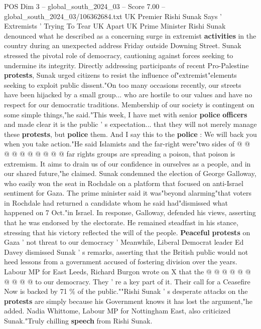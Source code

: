 \begin{textsample}{POS Dim 3 – global\_south\_2024\_03 – Score 7.00 – global\_south\_2024\_03/106362684.txt}  \label{ex:f3_pos_413}
UK Premier Rishi Sunak Says ' Extremists ' Trying To Tear UK Apart UK Prime Minister Rishi Sunak denounced what he described as a concerning surge in extremist \textbf{activities} in the country during an unexpected address Friday outside Downing Street.
Sunak stressed the pivotal role of democracy, cautioning against forces seeking to undermine its integrity.
Directly addressing participants of recent Pro-Palestine \textbf{protests}, Sunak urged citizens to resist the influence of"extremist"elements seeking to exploit public dissent."On too many occasions recently, our streets have been hijacked by a small group... who are hostile to our values and have no respect for our democratic traditions.
Membership of our society is contingent on some simple things,"he said."This week, I have met with senior \textbf{police} \textbf{officers} and made clear it is the public ' s expectation... that they will not merely manage these \textbf{protests}, but \textbf{police} them.
And I say this to the \textbf{police} : We will back you when you take action."He said Islamists and the far-right were"two sides of @ @ @ @ @ @ @ @ @ @ far rights groups are spreading a poison, that poison is extremism.
It aims to drain us of our confidence in ourselves as a people, and in our shared future,"he claimed.
Sunak condemned the election of George Galloway, who easily won the seat in Rochdale on a platform that focused on anti-Israel sentiment for Gaza.
The prime minister said it was"beyond alarming"that voters in Rochdale had returned a candidate whom he said had"dismissed what happened on 7 Oct."in Israel.
In response, Galloway, defended his views, asserting that he was endorsed by the electorate.
He remained steadfast in his stance, stressing that his victory reflected the will of the people. \textbf{Peaceful} \textbf{protests} on Gaza ' not threat to our democracy ' Meanwhile, Liberal Democrat leader Ed Davey dismissed Sunak ' s remarks, asserting that the British public would not heed lessons from a government accused of fostering division over the years.
Labour MP for East Leeds, Richard Burgon wrote on X that the @ @ @ @ @ @ @ @ @ @ to our democracy.
They ' re a key part of it.
Their call for a Ceasefire Now is backed by 71 \% of the public.""Rishi Sunak ' s desperate attacks on the \textbf{protests} are simply because his Government knows it has lost the argument,"he added.
Nadia Whittome, Labour MP for Nottingham East, also criticized Sunak."Truly chilling \textbf{speech} from Rishi Sunak.

\end{textsample}
